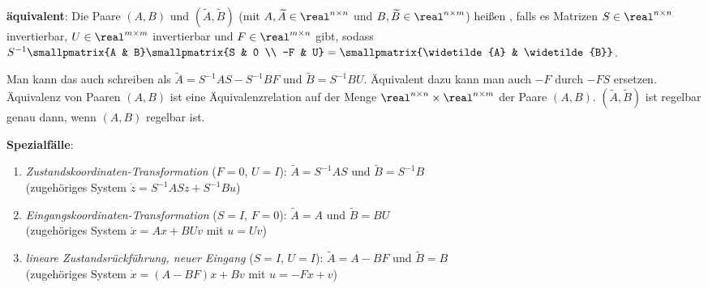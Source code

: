 \textbf{äquivalent}:
Die Paare $(A, B)$ und $(\widetilde{A}, \widetilde{B})$
(mit $A, \widetilde{A} \in \real^{n \times n}$ und
$B, \widetilde{B} \in \real^{n \times m}$) heißen ,
falls es Matrizen $S \in \real^{n \times n}$ invertierbar, $U \in \real^{m \times m}$
invertierbar und $F \in \real^{m \times n}$ gibt, sodass
$S^{-1} \smallpmatrix{A & B} \smallpmatrix{S & 0 \\ -F & U} =
\smallpmatrix{\widetilde{A} & \widetilde{B}}$.

Man kann das auch schreiben als
$\widetilde{A} = S^{-1} AS - S^{-1} BF$ und $\widetilde{B} = S^{-1} BU$.
Äquivalent dazu kann man auch $-F$ durch $-FS$ ersetzen.
Äquivalenz von Paaren $(A, B)$ ist eine Äquivalenzrelation
auf der Menge $\real^{n \times n} \times \real^{n \times m}$ der Paare $(A, B)$.
$(\widetilde{A}, \widetilde{B})$ ist regelbar genau dann, wenn $(A, B)$ regelbar ist.

\textbf{Spezialfälle}:
\begin{enumerate}
    \item
    \emph{Zustandskoordinaten-Transformation} ($F = 0$, $U = I$):
    $\widetilde{A} = S^{-1} AS$ und $\widetilde{B} = S^{-1} B$\\
    (zugehöriges System $\dot{z} = S^{-1} ASz + S^{-1} Bu$)
    
    \item
    \emph{Eingangskoordinaten-Transformation} ($S = I$, $F = 0$):
    $\widetilde{A} = A$ und $\widetilde{B} = BU$\\
    (zugehöriges System $\dot{x} = Ax + BUv$ mit $u = Uv$)
    
    \item
    \emph{lineare Zustandsrückführung, neuer Eingang} ($S = I$, $U = I$):
    $\widetilde{A} = A - BF$ und $\widetilde{B} = B$\\
    (zugehöriges System $\dot{x} = (A - BF)x + Bv$ mit $u = -Fx + v$)
\end{enumerate}

\linie
\pagebreak

